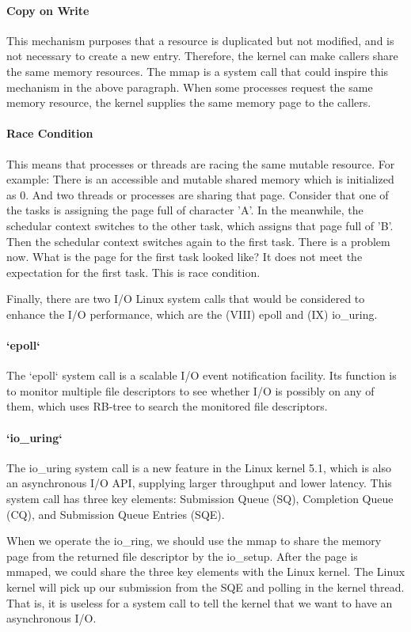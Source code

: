 \documentclass[12pt,a4paper]{article}
\begin{document}
\paragraph{Copy on Write}
This mechanism purposes that a resource is duplicated but not modified, and is not
necessary to create a new entry. Therefore, the kernel can make callers share
the same memory resources. The mmap is a system call that could inspire this
mechanism in the above paragraph. When some processes request the same memory resource,
the kernel supplies the same memory page to the callers.

\paragraph{Race Condition}
This means that processes or threads are racing the same mutable resource. For example:
There is an accessible and mutable shared memory which is initialized as 0. And
two threads or processes are sharing that page. Consider that one of the tasks is assigning
the page full of character 'A'. In the meanwhile, the schedular context switches to
the other task, which assigns that page full of 'B'. Then the schedular context switches
again to the first task. There is a problem now. What is the page for the first
task looked like? It does not meet the expectation for the first task.
This is race condition.

Finally, there are two I/O Linux system calls that would be considered to enhance
the I/O performance, which are the (\RN{8}) epoll and (\RN{9}) io\_uring.

\paragraph{`epoll`}
The `epoll` system call is a scalable I/O event notification facility. Its function
is to monitor multiple file descriptors to see whether I/O is possibly on any of
them, which uses RB-tree to search the monitored file descriptors.

\paragraph{`io\_uring`}
The io\_uring system call is a new feature in the Linux kernel 5.1, which is also an
asynchronous I/O API, supplying larger throughput and lower latency. This system call
has three key elements: Submission Queue (SQ), Completion Queue (CQ), and Submission Queue
Entries (SQE).

When we operate the io\_ring, we should use the mmap to share the memory page from
the returned file descriptor by the io\_setup. After the page is mmaped, we could share
the three key elements with the Linux kernel. The Linux kernel will pick up our submission
from the SQE and polling in the kernel thread. That is, it is useless for a system call
to tell the kernel that we want to have an asynchronous I/O.
\end{document}
